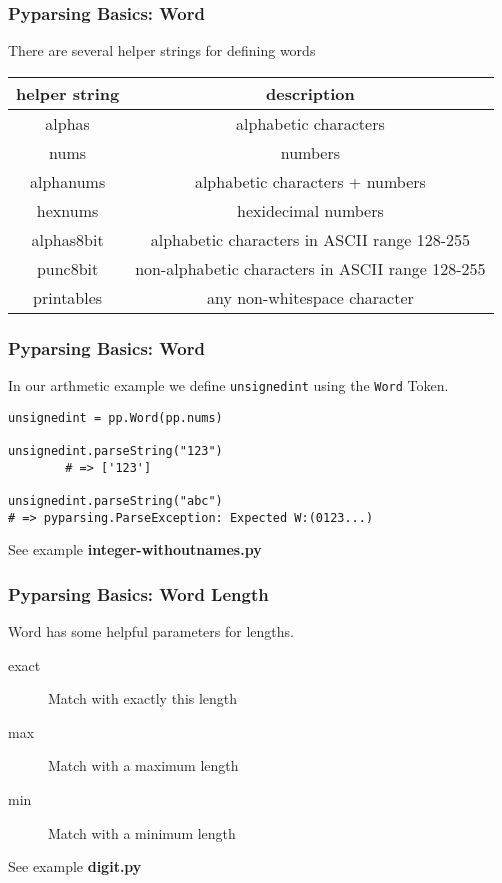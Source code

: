 \documentclass{beamer}
\begin{document}
\begin{frame}[fragile]
 \frametitle{Pyparsing Basics: Word}
There are several helper strings for defining words \\ 
\begin{center}
  \begin{tabular}{ | c | c | }
    \hline
    helper string & description \\ \hline\hline
    alphas & alphabetic characters  \\ \hline
    nums & numbers \\ \hline
    alphanums & alphabetic characters + numbers  \\ \hline
    hexnums & hexidecimal numbers  \\ \hline
    alphas8bit & alphabetic characters in ASCII range 128-255 \\ \hline
    punc8bit & non-alphabetic characters in ASCII range 128-255 \\ \hline
    printables & any non-whitespace character \\
  \hline
  \end{tabular}
\end{center}

\end{frame}

\begin{frame}[fragile]
 \frametitle{Pyparsing Basics: Word}
In our arthmetic example we define \texttt{unsignedint} using the \texttt{Word} Token.
\begin{verbatim}
unsignedint = pp.Word(pp.nums)

unsignedint.parseString("123")
        # => ['123']	

unsignedint.parseString("abc")
# => pyparsing.ParseException: Expected W:(0123...)	
\end{verbatim}
See example \textbf{integer-withoutnames.py}
\end{frame}

\begin{frame}
\frametitle{Pyparsing Basics: Word Length}
Word has some helpful parameters for lengths.

\begin{description}
\item[exact] Match with exactly this length
\item[max] Match with a maximum length
\item[min] Match with a minimum length
\end{description}
\bigskip

See example \textbf{digit.py}
\end{frame}
\end{document}
